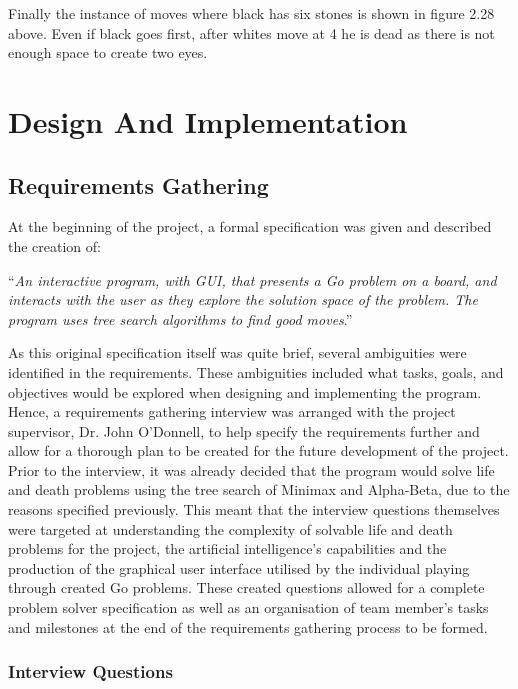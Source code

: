 \documentclass{l3proj}
\begin{document}
Finally the instance of moves where black has six stones is shown in figure 2.28 above. Even if black goes first, after whites move at 4 he is dead as there is not enough space to create two eyes.

\chapter{Design And Implementation}
\label{design}

\section{Requirements Gathering}

At the beginning of the project, a formal specification was given and described the creation of: 
\begin{center}
“\textit{An interactive program, with GUI, that presents a Go problem on a board, and interacts with the user as they explore the solution space of the problem. The program uses tree search algorithms to find good moves}.”  
\end{center}
As this original specification itself was quite brief, several ambiguities were identified in the requirements. These ambiguities included what tasks, goals, and objectives would be explored when designing and implementing the program. Hence, a requirements gathering interview was arranged with the project supervisor, Dr. John O'Donnell, to help specify the requirements further and allow for a thorough plan to be created for the future development of the project. 
\\Prior to the interview, it was already decided that the program would solve life and death problems using the tree search of Minimax and Alpha-Beta, due to the reasons specified previously. This meant that the interview questions themselves were targeted at understanding the complexity of solvable life and death problems for the project, the artificial intelligence's capabilities and the production of the graphical user interface utilised by the individual playing through created Go problems. These created questions allowed for a complete problem solver specification as well as an organisation of team member's tasks and milestones at the end of the requirements gathering process to be formed.

\subsection{Interview Questions}
\end{document}

